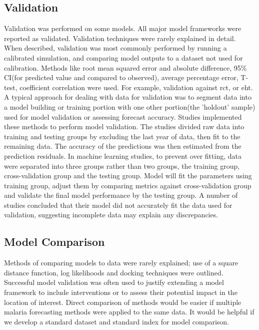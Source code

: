 \documentclass[a4paper, 12pt, twoside]{article}
\begin{document}
\subsection{Validation}%
\label{par:validation}
Validation was performed on some models.
All major model frameworks were reported as validated.
Validation techniques were rarely explained in detail.
When described, validation was most commonly performed by running a calibrated simulation, and comparing model outputs to a dataset not used for calibration.
Methods like root mean squared error and absolute difference\cite{Adimi2010, Rahman2011}, 95\% CI(for predicted value and compared to observed)\cite{Chatterjee2009,Gomez-Elipe2007,Roy2011}, average percentage error\cite{Haghdoost2008}, T-test\cite{Xiao2010}, coefficient correlation\cite{Yacob1947} were used.
For example, validation against \gls{rct}, or \gls{eht}.
A typical approach for dealing with data for validation was to segment data into a model building or training portion with one other portion(the 'holdout' sample) used for model validation or assessing forecast accuracy.
Studies\cite{Parveen2021,Rahman2011} implemented these methods to perform model validation.
The studies divided raw data into training and testing groups by excluding the last year of data, then fit to the remaining data.
The accuracy of the predictions was then estimated from the prediction residuals.
In machine learning studies, to prevent over fitting, data were separated into three groups rather than two groups, the training group, cross-validation group and the testing group.
Model will fit the parameters using training group, adjust them by comparing metrics against cross-validation group and validate the final model performance by the testing group.
A number of studies concluded that their model did not accurately fit the data used for validation, suggesting incomplete data may explain any discrepancies.

\subsection{Model Comparison}%
\label{par:comparing_models}
Methods of comparing models to data were rarely explained; use of a square distance function, log likelihoods and docking techniques were outlined.
Successful model validation was often used to justify extending a model framework to include interventions or to assess their potential impact in the location of interest.
Direct comparison of methods would be easier if multiple malaria forecasting methods were applied to the same data.
It would be helpful if we develop a standard dataset and standard index for model comparison.
\end{document}
